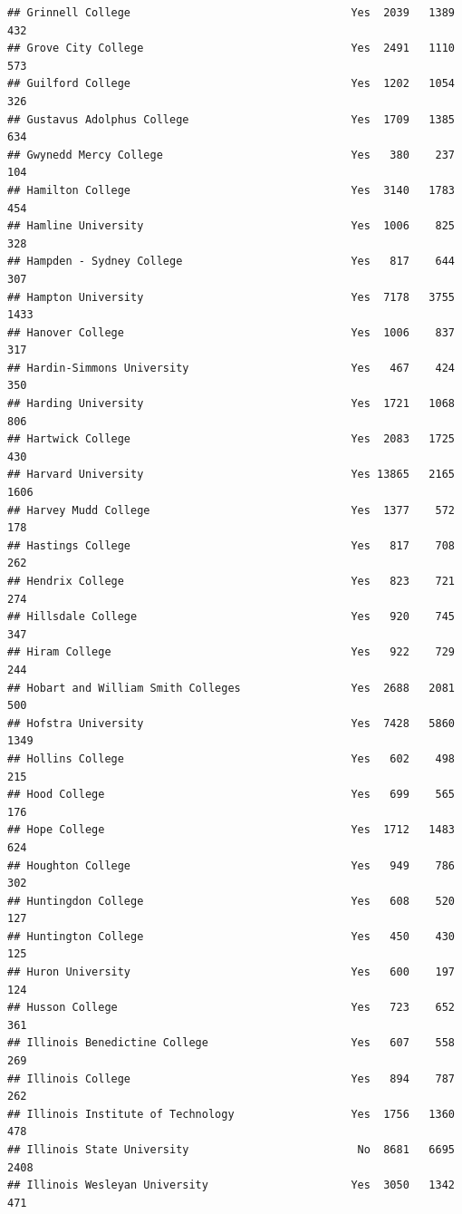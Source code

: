 \documentclass[
]{article}
\begin{document}
\begin{verbatim}
## Grinnell College                                  Yes  2039   1389    432
## Grove City College                                Yes  2491   1110    573
## Guilford College                                  Yes  1202   1054    326
## Gustavus Adolphus College                         Yes  1709   1385    634
## Gwynedd Mercy College                             Yes   380    237    104
## Hamilton College                                  Yes  3140   1783    454
## Hamline University                                Yes  1006    825    328
## Hampden - Sydney College                          Yes   817    644    307
## Hampton University                                Yes  7178   3755   1433
## Hanover College                                   Yes  1006    837    317
## Hardin-Simmons University                         Yes   467    424    350
## Harding University                                Yes  1721   1068    806
## Hartwick College                                  Yes  2083   1725    430
## Harvard University                                Yes 13865   2165   1606
## Harvey Mudd College                               Yes  1377    572    178
## Hastings College                                  Yes   817    708    262
## Hendrix College                                   Yes   823    721    274
## Hillsdale College                                 Yes   920    745    347
## Hiram College                                     Yes   922    729    244
## Hobart and William Smith Colleges                 Yes  2688   2081    500
## Hofstra University                                Yes  7428   5860   1349
## Hollins College                                   Yes   602    498    215
## Hood College                                      Yes   699    565    176
## Hope College                                      Yes  1712   1483    624
## Houghton College                                  Yes   949    786    302
## Huntingdon College                                Yes   608    520    127
## Huntington College                                Yes   450    430    125
## Huron University                                  Yes   600    197    124
## Husson College                                    Yes   723    652    361
## Illinois Benedictine College                      Yes   607    558    269
## Illinois College                                  Yes   894    787    262
## Illinois Institute of Technology                  Yes  1756   1360    478
## Illinois State University                          No  8681   6695   2408
## Illinois Wesleyan University                      Yes  3050   1342    471

\end{verbatim}
\end{document}
